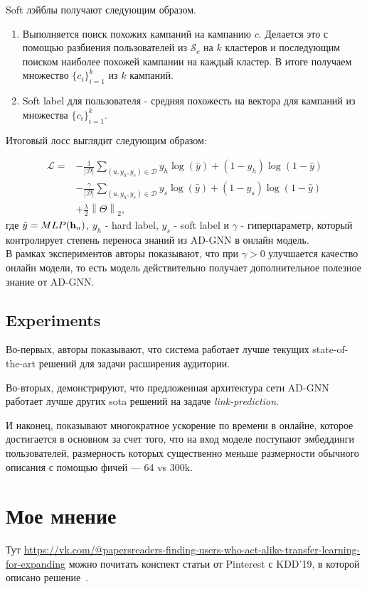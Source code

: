 Soft лэйблы получают следующим образом.
\begin{enumerate}
    \item Выполняется поиск похожих кампаний на кампанию $c$. 
    Делается это с помощью разбиения пользователей из $\mathcal{S}_c$ на $k$ кластеров и последующим поиском наиболее похожей кампании на каждый кластер. В итоге получаем множество $\{c_i\}^{k}_{i=1}$ из $k$ кампаний.
    \item Soft label для пользователя - средняя похожесть на вектора для кампаний из множества  $\{c_i\}^{k}_{i=1}$.
\end{enumerate}

Итоговый лосс выглядит следующим образом:

\begin{align*}
    \mathcal{L}=&-\frac{1}{\left|\mathcal{D}\right|} \sum_{\left(u, y_{h}, y_{s}\right) \in \mathcal{D}} y_{h} \log \left(\hat{y}\right)+\left(1-y_{h}\right) \log \left(1-\hat{y}\right) \\
    &-\frac{\gamma}{\left|\mathcal{D}\right|} \sum_{\left(u, y_{h}, y_{s}\right) \in \mathcal{D}} y_{s} \log \left(\hat{y}\right)+\left(1-y_{s}\right) \log \left(1-\hat{y}\right) \\
    &+\frac{\lambda}{2}\left\|\Theta\right\|_{2} ,
\end{align*}
где $\hat{y} = MLP({\bf h}_u)$, $y_h$ - hard label, $y_s$ - soft label и $\gamma$ - гиперпараметр, который контролирует степень переноса знаний из AD-GNN в онлайн модель. \\

В рамках экспериментов авторы показывают, что при $\gamma > 0$ улучшается качество онлайн модели, то есть модель действительно получает дополнительное полезное знание от AD-GNN.

\subsection*{Experiments}

Во-первых, авторы показывают, что система работает лучше текущих state-of-the-art решений для задачи расширения аудитории.

Во-вторых, демонстрируют, что предложенная архитектура сети AD-GNN работает лучше других sota решений на задаче \textit{link-prediction}.

И наконец, показывают многократное ускорение по времени в онлайне, которое достигается в основном за счет того, что на вход моделе поступают эмбеддинги пользователей, размерность которых существенно меньше размерности обычного описания с помощью фичей --- 64 vs 300k.

\section*{Мое мнение}

Тут \url{https://vk.com/@papersreaders-finding-users-who-act-alike-transfer-learning-for-expanding} можно почитать конспект статьи от Pinterest с KDD'19, в которой описано решение~\cite{dewet2019finding}.